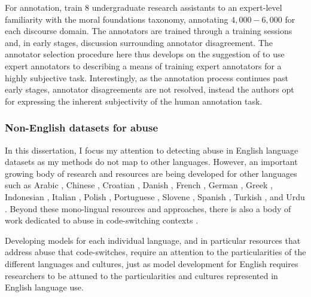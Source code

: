 For annotation, \citet{Hoover:2019} train $8$ undergraduate research assistants to an expert-level familiarity with the moral foundations taxonomy, annotating $4,000 - 6,000$ for each discourse domain. The annotators are trained through a training sessions and, in early stages, discussion surrounding annotator disagreement.  
The annotator selection procedure here thus develops on the suggestion of \citet{Waseem:2016} to use expert annotators to describing a means of training expert annotators for a highly subjective task. Interestingly, as the annotation process continues past early stages, annotator disagreements are not resolved, instead the authors opt for expressing the inherent subjectivity of the human annotation task.

\subsubsection{Non-English datasets for abuse}

In this dissertation, I focus my attention to detecting abuse in English language datasets as my methods do not map to other languages. However, an important growing body of research and resources are being developed for other languages such as Arabic \citep{Arabic abuse papers}, Chinese \citep{Chinese abuse papers}, Croatian \citep{Croatian papers}, Danish \citep{Danish abuse data}, French \citep{French papers}, German \citep{German papers}, Greek \citep{Greek papers}, Indonesian \citep{Indonesian papers}, Italian \citep{Italian papers}, Polish \citep{Polish papers}, Portuguese \citep{Portuguese papers}, Slovene \citep{Slovenian papers}, Spanish \citep{Spanish papers}, Turkish \citep{Turkish papers}, and Urdu \citep{Urdu papers}. Beyond these mono-lingual resources and approaches, there is also a body of work dedicated to abuse in code-switching contexts \citep{Code switching papers}.

Developing models for each individual language, and in particular resources that address abuse that code-switches, require an attention to the particularities of the different languages and cultures, just as model development for English requires researchers to be attuned to the particularities and cultures represented in English language use.


